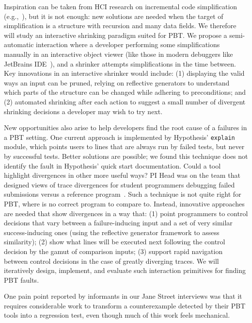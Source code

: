 Inspiration can be taken from HCI research on incremental code simplification
(e.g.,~\cite{ref:lim2018ply,ref:head2018interactive,ref:holmes2012systematizing,ref:hibschman2016telescope}), 
but it is not enough: new solutions are needed when the target of simplification 
is a structure with recursion and many data fields. We therefore will study an 
interactive shrinking paradigm suited for PBT. We propose a semi-automatic 
interaction where a developer performing some simplifications manually in an 
interactive
object viewer (like those in modern debuggers like JetBrains 
IDE~\cite{tool:jetbrains}), and a shrinker attempts
simplifications in the time between. Key innovations in an interactive shrinker 
would include: (1) displaying
the valid ways an input can be pruned,
relying on reflective generators to understand which parts of the
structure can be changed while adhering to preconditions; and (2) automated 
shrinking after each  action to suggest a small number of divergent shrinking 
decisions a developer may wish to try next.

New opportunities also arise to help developers find the root cause of a 
failures in a PBT setting. One current approach is implemented by Hypothesis' 
\texttt{explain} module, which points users to lines that are always run by 
failed tests, but never by successful tests. Better solutions are possible; we 
found this technique does not identify the fault in Hypothesis' quick start 
documentation. Could a tool highlight divergences in other more useful ways? PI 
Head was on the team that designed views of trace divergences for student 
programmers debugging failed submissions versus a reference 
program~\cite{ref:suzuki2017tracediff}.  Such a technique is not quite right for 
PBT, where is no correct program to compare to.  Instead, innovative approaches 
are needed that show divergences in a way that: (1) point programmers to control 
decisions that vary between a failure-inducing input and a set of very similar 
success-inducing ones (using the reflective generator framework to assess 
similarity); (2) show what lines will be executed next following the control 
decision by the gamut of comparison inputs; (3) support rapid navigation between 
control decisions in the case of greatly diverging traces. We will iteratively 
design, implement, and evaluate such interaction primitives for finding PBT 
faults.


%
One pain
point reported
by informants in our Jane Street interviews was that it requires
considerable work to
transform a counterexample detected by their PBT tools into a
regression test, even though much of this work
feels mechanical.

